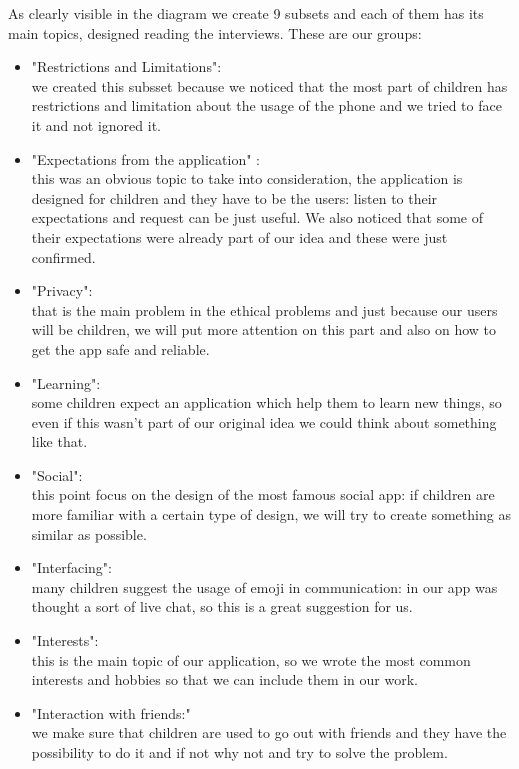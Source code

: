\documentclass[12pt]{report}
\begin{document}
  As clearly visible in the diagram we create 9 subsets and each of them has its
  main topics, designed reading the interviews. These are our groups:
	\begin{itemize}
		\item "Restrictions and Limitations":\\
		       we created this subsset because we noticed that the most part of children has
					 restrictions and limitation about the usage of the phone and we tried to face it
					 and not ignored it.
		\item "Expectations from the application" :\\
		       this was an obvious topic to take into consideration, the application is designed
					 for children and they have to be the users: listen to their expectations and request
					 can be just useful. We also noticed that some of their expectations were already part
					 of our idea and these were just confirmed.
		\item "Privacy":\\
		       that is the main problem in the ethical problems and just because our users will be children,
					 we will put more attention on this part and also on how to get the app safe and reliable.
		\item "Learning":\\
		       some children expect an application which help them to learn new things, so even if this wasn't
					 part of our original idea we could think about something like that.
		\item "Social":\\
		       this point focus on the design of the most famous social app: if children are more familiar
					 with a certain type of design, we will try to create something as similar as possible.
		\item "Interfacing":\\
		       many children suggest the usage of emoji in communication: in our app was thought a sort
					 of live chat, so this is a great suggestion for us.
		\item "Interests":\\
		       this is the main topic of our application, so we wrote the most common interests and hobbies
					 so that we can include them in our work.
		\item "Interaction with friends:"\\
		       we make sure that children are used to go out with friends and they have the possibility to do
					 it and if not why not and try to solve the problem.

	\end{itemize}
\end{document}
